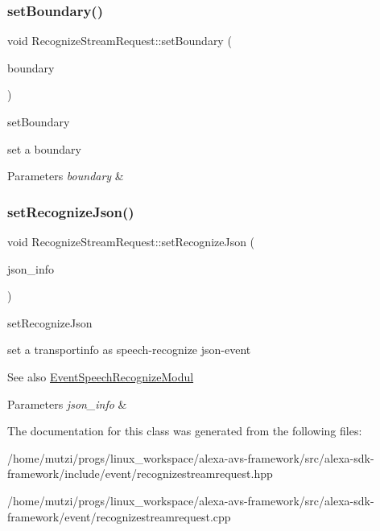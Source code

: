 \subsubsection{\texorpdfstring{set\+Boundary()}{setBoundary()}}
{\footnotesize\ttfamily void Recognize\+Stream\+Request\+::set\+Boundary (\begin{DoxyParamCaption}\item[{const char $\ast$}]{boundary }\end{DoxyParamCaption})}



set\+Boundary 

set a boundary 
\begin{DoxyParams}{Parameters}
{\em boundary} & \\
\hline
\end{DoxyParams}
\mbox{\label{classAlexaEvent_1_1RecognizeStreamRequest_a118e9bb212b04d4bf8b2eea8800dcab4}} 
\subsubsection{\texorpdfstring{set\+Recognize\+Json()}{setRecognizeJson()}}
{\footnotesize\ttfamily void Recognize\+Stream\+Request\+::set\+Recognize\+Json (\begin{DoxyParamCaption}\item[{\hyperlink{classAlexaEvent_1_1TransportInfo}{Transport\+Info} $\ast$}]{json\+\_\+info }\end{DoxyParamCaption})}



set\+Recognize\+Json 

set a transportinfo as speech-\/recognize json-\/event \begin{DoxySeeAlso}{See also}
\hyperlink{classAlexaEvent_1_1EventSpeechRecognizeModul}{Event\+Speech\+Recognize\+Modul} 
\end{DoxySeeAlso}

\begin{DoxyParams}{Parameters}
{\em json\+\_\+info} & \\
\hline
\end{DoxyParams}


The documentation for this class was generated from the following files\+:\begin{DoxyCompactItemize}
\item 
/home/mutzi/progs/linux\+\_\+workspace/alexa-\/avs-\/framework/src/alexa-\/sdk-\/framework/include/event/recognizestreamrequest.\+hpp\item 
/home/mutzi/progs/linux\+\_\+workspace/alexa-\/avs-\/framework/src/alexa-\/sdk-\/framework/event/recognizestreamrequest.\+cpp\end{DoxyCompactItemize}
